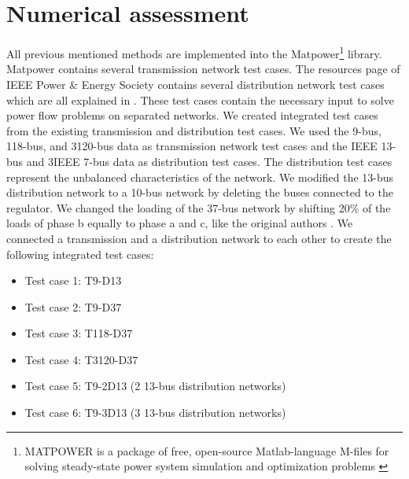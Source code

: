 \documentclass[10pt,journal]{article}
\begin{document}
\section{Numerical assessment}
All previous mentioned methods are implemented into the Matpower\footnote{MATPOWER is a package of free, open-source Matlab-language M-files for solving steady-state power system simulation and optimization problems \cite{Zimmerman2011}} library. Matpower contains several transmission network test cases. The resources page of IEEE Power \& Energy Society contains several distribution network test cases which are all explained in \cite{Schneider2018}. These test cases contain the necessary input to solve power flow problems on separated networks. We created integrated test cases from the existing transmission and distribution test cases. We used the 9-bus, 118-bus, and 3120-bus data as transmission network test cases and the IEEE 13-bus and 3IEEE 7-bus data as distribution test cases. The distribution test cases represent the unbalanced characteristics of the network. We modified the 13-bus distribution network to a 10-bus network by deleting the buses connected to the regulator. We changed the loading of the 37-bus network by shifting 20\% of the loads of phase b equally to phase a and c, like the original authors \cite{Taranto2008}.
We connected a transmission and a distribution network to each other to create the following integrated test cases: 
\begin{itemize}
    \item Test case 1: T9-D13
    \item Test case 2: T9-D37
    \item Test case 3: T118-D37
    \item Test case 4: T3120-D37
    \item Test case 5: T9-2D13 (2 13-bus distribution networks) 
    \item Test case 6: T9-3D13 (3 13-bus distribution networks) 
\end{itemize}
\end{document}
